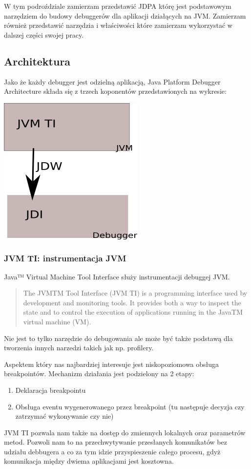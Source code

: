W tym podroździale zamierzam przedstawić JDPA którę jest podstawowym narzędziem do budowy debuggerów dla aplikacji działących na JVM. Zamierzam również przedstawić narzędzia i właściwości które zamierzam wykorzystać w dalszej części swojej pracy.

\subsection{Architektura}

Jako że każdy debugger jest odzielną aplikacją, Java Platform Debugger Architecture składa się z trzech koponentów przedstawionych na wykresie:

\includegraphics{imgs/jdpa}

\subsubsection{JVM TI: instrumentacja JVM} 

Java™ Virtual Machine Tool Interface służy instrumentacji debuggej JVM.

\begin{quote}
The JVMTM Tool Interface (JVM TI) is a programming interface used by development and monitoring tools. It provides both a way to inspect the state and to control the execution of applications running in the JavaTM virtual machine (VM). \cite{jvmtiSpec}
\end{quote}

Nie jest to tylko narzędzie do debugowania ale może być także podstawą dla tworzenia innych narzedzi takich jak np. profilery.

Aspektem który nas najbardziej interesuje jest niskopoziomowa obsługa breakpointów. Mechanizm działania jest podzielony na 2 etapy:

\begin{enumerate}
\item Deklaracja breakpointu
\item Obsługa eventu wygenerowanego przez breakpoint (tu następuje decyzja czy zatrzymać wykonywanie czy nie)
\end{enumerate}
JVM TI pozwala nam także na dostęp do zmiennych lokalnych oraz parametrów metod. Pozwoli nam to na przechwytywanie przesłanych komunikatów bez udziału debbugera a co za tym idzie przyspieszenie całego procesu, gdyż komunikacja między dwiema aplikacjami jest kosztowna.


